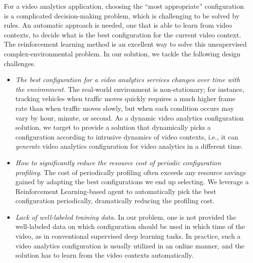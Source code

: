 
For a video analytics application, choosing the ``most appropriate'' configuration is a complicated decision-making problem, which is challenging to be solved by rules. An automatic approach is needed, one that is able to learn from video contexts, to decide what is the best configuration for the current video context. The reinforcement learning method is an excellent way to solve this unsupervised complex-environmental problem. In our solution, we tackle the following design challenges.



\begin{itemize}	
\item \emph{The best configuration for a video analytics services changes over time with the environment.} The real-world environment is non-stationary; for instance, tracking vehicles when traffic moves quickly requires a much higher frame rate than when traffic moves slowly, but when each condition occurs may vary by hour, minute, or second. As a dynamic video analytics configuration solution, we target to provide a solution that dynamically picks a configuration according to intrusive dynamics of video contexts, i.e., it can \emph{generate} video analytics configuration for video analytics in a different time.

\item \emph{How to significantly reduce the resource cost of periodic configuration profiling.} The cost of periodically profiling often exceeds any resource savings gained by adapting the best configurations we end up selecting. We leverage a Reinforcement Learning-based agent to automatically pick the best configuration periodically, dramatically reducing the profiling cost. 

\item \emph{Lack of well-labeled training data.} In our problem, one is not provided the well-labeled data on which configuration should be used in which time of the video, as in conventional supervised deep learning tasks. In practice, such a video analytics configuration is usually utilized in an online manner, and the solution has to learn from the video contexts automatically. 
\end{itemize}

